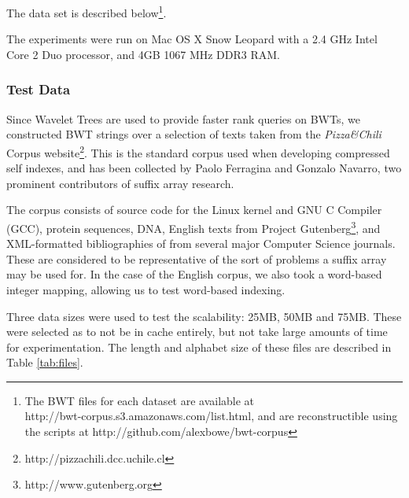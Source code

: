 The data set is described below\footnote{The BWT files for each dataset are 
available at\\ http://bwt-corpus.s3.amazonaws.com/list.html, and are 
reconstructible using the scripts at http://github.com/alexbowe/bwt-corpus}.

The experiments were run on Mac OS X Snow Leopard with a 2.4 GHz Intel Core 2
Duo processor, and 4GB 1067 MHz DDR3 RAM.

\subsubsection{Test Data}
Since Wavelet Trees are used to provide faster rank queries on BWTs, we
constructed BWT strings over a selection of texts taken from the \emph{Pizza\&Chili}
Corpus website\footnote{http://pizzachili.dcc.uchile.cl}. This is the standard
corpus used when developing compressed self indexes, and has been collected by
Paolo Ferragina and Gonzalo Navarro, two prominent contributors of suffix array 
research.

The corpus consists of source code for the Linux kernel and GNU C Compiler
(GCC), protein sequences, DNA, English texts from Project
Gutenberg\footnote{http://www.gutenberg.org}, and XML-formatted bibliographies
of from several major Computer Science journals. These are considered to be
representative of the sort of problems a suffix array may be used for. In the 
case of the English corpus, we also took a word-based integer mapping, allowing 
us to test word-based indexing.

Three data sizes were used to test the scalability: 25MB, 50MB and 75MB. 
These were selected as to not be in cache entirely, but not take large amounts 
of time for experimentation. The length and alphabet size of these files are 
described in Table \ref{tab:files}.

